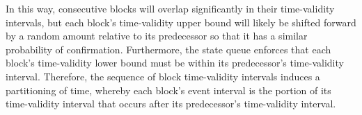 \documentclass[../midgard.tex]{subfiles}
\begin{document}
In this way, consecutive blocks will overlap significantly in their time-validity intervals, but each block's time-validity upper bound will likely be shifted forward by a random amount relative to its predecessor so that it has a similar probability of confirmation.
Furthermore, the state queue enforces that each block's time-validity lower bound must be within its predecessor's time-validity interval.
Therefore, the sequence of block time-validity intervals induces a partitioning of time, whereby each block's event interval is the portion of its time-validity interval that occurs after its predecessor's time-validity interval.

\end{document}
